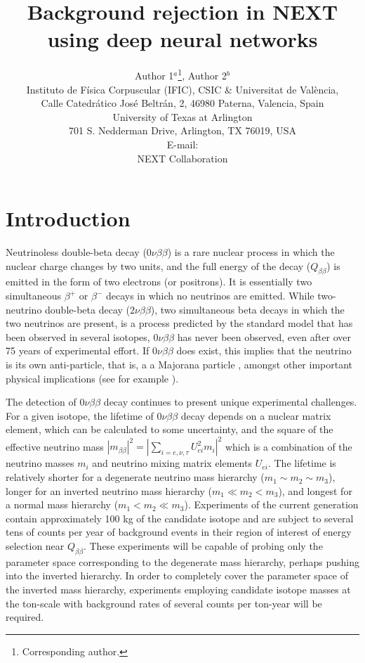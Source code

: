 \documentclass{JINST}
\title{Background rejection in NEXT using deep neural networks}
\author{Author 1$^a$\thanks{Corresponding author.},
Author 2$^b$\\
\llap{$^a$}Instituto de F\'isica Corpuscular (IFIC), CSIC \& Universitat de Val\`encia,\\ 
Calle Catedr\'atico Jos\'e Beltr\'an, 2, 46980 Paterna, Valencia, Spain\\
\llap{$^b$}University of Texas at Arlington\\
 701 S. Nedderman Drive, Arlington, TX 76019, USA\\
E-mail: \email{correspodingauthor@ific.uv.es}\\

NEXT Collaboration}
\begin{document}
\section{Introduction}\label{sec:intro}
\noindent Neutrinoless double-beta decay ($0\nu\beta\beta$) is a rare nuclear process in which the nuclear charge changes by two units, and the full energy of the decay ($Q_{\beta\beta}$) is 
emitted in the form of two electrons (or positrons).  It is essentially two simultaneous $\beta^{+}$ or $\beta^{-}$ decays in which no neutrinos are emitted.  While two-neutrino double-beta 
decay ($2\nu\beta\beta$), two simultaneous beta decays in which the two neutrinos are present, is a process predicted by the standard model that has been observed in several isotopes, 
$0\nu\beta\beta$ has never been observed, even after over 75 years of experimental effort.  If $0\nu\beta\beta$ does exist, this implies that the neutrino is its own anti-particle, that is, a
a Majorana particle \cite{Schechter_1982}, amongst other important physical implications (see for example \cite{GomezCadenas:2013ue, Cadenas_2012, Avignone_2008}).

The detection of $0\nu\beta\beta$ decay continues to present unique experimental challenges.  For a given isotope, the lifetime of $0\nu\beta\beta$ decay depends on a nuclear matrix element, 
which can be calculated to some uncertainty, and the square of the effective neutrino mass $|m_{\beta\beta}|^2 = |\sum_{i=e,\nu,\tau}U_{ei}^2m_{i}|^2$ which is a combination of the neutrino
masses $m_{i}$ and neutrino mixing matrix elements $U_{ei}$.  The lifetime is relatively shorter for a degenerate neutrino mass hierarchy ($m_1 \sim m_2 \sim m_3$), longer for an inverted 
neutrino mass hierarchy ($m_1 \ll m_2 < m_3$), and longest for a normal mass hierarchy ($m_1 < m_2 \ll m_3$).  Experiments of the current generation contain approximately
100 kg of the candidate isotope and are subject to several tens of counts per year of background events in their region of interest of energy selection near $Q_{\beta\beta}$.  These experiments
will be capable of probing only the parameter space corresponding to the degenerate mass hierarchy, perhaps pushing into the inverted hierarchy.  In order to completely cover the parameter 
space of the inverted mass hierarchy, experiments employing candidate isotope masses at the ton-scale with background rates of several counts per ton-year will be required.  
\end{document}
